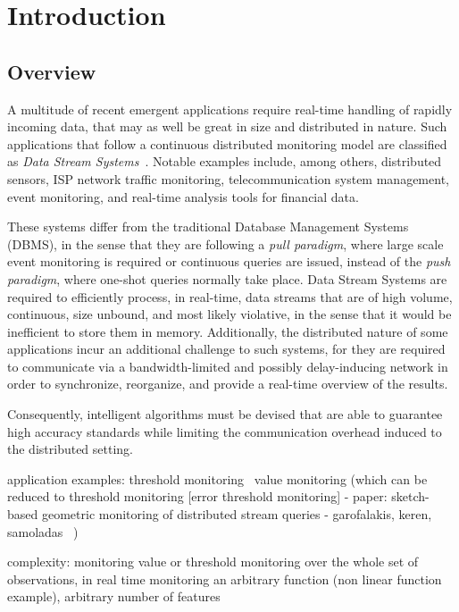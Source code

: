 \chapter{Introduction} \label{chap:intro}
\section{Overview} \label{sec:intro-overview}


A multitude of recent emergent applications require real-time handling of rapidly incoming data, that may as well be great in size and distributed in nature. Such applications that follow a continuous distributed monitoring model are classified as \emph{Data Stream Systems}~\cite{Babcock2002DataStreamSystems}. Notable examples include, among others, distributed sensors, ISP network traffic monitoring, telecommunication system management, event monitoring, and real-time analysis tools for financial data.

These systems differ from the traditional Database Management Systems (DBMS), in the sense that they are following a \emph{pull paradigm}, where large scale event monitoring is required or continuous queries are issued, instead of the \emph{push paradigm}, where one-shot queries normally take place. Data Stream Systems are required to efficiently process, in real-time, data streams that are of high volume, continuous, size unbound, and most likely violative, in the sense that it would be inefficient to store them in memory. Additionally, the distributed nature of some applications incur an additional challenge to such systems, for they are required to communicate via a bandwidth-limited and possibly delay-inducing network in order to synchronize, reorganize, and provide a real-time overview of the results.

Consequently, intelligent algorithms must be devised that are able to guarantee high accuracy standards while limiting the communication overhead induced to the distributed setting. 


application examples: 	threshold monitoring~\cite{Sharfman2006GM}
						value monitoring (which can be reduced to threshold monitoring [error threshold monitoring] - paper: sketch-based geometric monitoring of distributed stream queries - garofalakis, keren, samoladas ~\cite{Garofalakis2013SketchBasedGM})
						

complexity: monitoring value or threshold monitoring over the whole set of observations, in real time
			monitoring an arbitrary function (non linear function example), 
			arbitrary number of features



